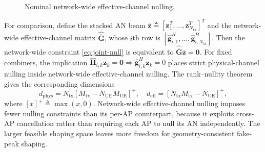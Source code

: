 \documentclass[letterpaper,journal]{IEEEtran}
\begin{document}
\begin{figure}[t]
    \centering
    \caption{Nominal network-wide effective-channel nulling.}
    \label{fig:asymmetry}
\end{figure}

For comparison, define the stacked AN beam $\overline{\mathbf{z}}\triangleq[\mathbf{z}_1^T,\ldots,\mathbf{z}_{N_{\mathrm{tx}}}^T]^T$ and the network-wide effective-channel matrix $\widehat{\overline{\mathbf{G}}}$, whose $i$th row is $[\widehat{\mathbf{g}}_{i,1}^H,\ldots,\widehat{\mathbf{g}}_{i,N_{\mathrm{tx}}}^H]$. Then the network-wide constraint \eqref{eq:joint-null} is equivalent to $\widehat{\overline{\mathbf{G}}}\overline{\mathbf{z}}=\mathbf{0}$. For fixed combiners, the implication $\widehat{\mathbf H}_{i,k}\mathbf z_k=\mathbf0\Rightarrow\widehat{\mathbf g}_{i,k}^H\mathbf z_k=0$ places strict physical-channel nulling inside network-wide effective-channel nulling. The rank--nullity theorem gives the corresponding dimensions
\begin{equation}
d_{\mathrm{phys}}=N_{\mathrm{tx}}[M_{\mathrm{tx}}-N_{\mathrm{UE}}M_{\mathrm{UE}}]^+,\quad
d_{\mathrm{eff}}=[N_{\mathrm{tx}}M_{\mathrm{tx}}-N_{\mathrm{UE}}]^+,
\label{eq:null-hierarchy-dim}
\end{equation}
where $[x]^+\triangleq\max(x,0)$. Network-wide effective-channel nulling imposes fewer nulling constraints than its per-AP counterpart, because it exploits cross-AP cancellation rather than requiring each AP to null its AN independently. The larger feasible shaping space leaves more freedom for geometry-consistent fake-peak shaping. 
\end{document}
